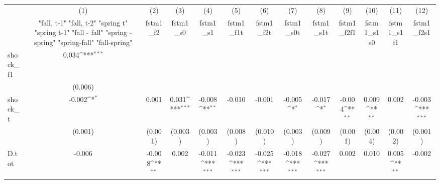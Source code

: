 {
\def\sym#1{\ifmmode^{#1}\else\(^{#1}\)\fi}
\begin{tabular}{l*{12}{c}}
\toprule
            &\multicolumn{1}{c}{(1)}&\multicolumn{1}{c}{(2)}&\multicolumn{1}{c}{(3)}&\multicolumn{1}{c}{(4)}&\multicolumn{1}{c}{(5)}&\multicolumn{1}{c}{(6)}&\multicolumn{1}{c}{(7)}&\multicolumn{1}{c}{(8)}&\multicolumn{1}{c}{(9)}&\multicolumn{1}{c}{(10)}&\multicolumn{1}{c}{(11)}&\multicolumn{1}{c}{(12)}\\
            &\multicolumn{1}{c}{  "fall, t-1" "fall, t-2" "spring t" "spring t-1"  "fall - fall" "spring - spring" "spring-fall" "fall-spring" }&\multicolumn{1}{c}{fstm1\_f2}&\multicolumn{1}{c}{fstm1\_s0}&\multicolumn{1}{c}{fstm1\_s1}&\multicolumn{1}{c}{fstm1\_f1t}&\multicolumn{1}{c}{fstm1\_f2t}&\multicolumn{1}{c}{fstm1\_s0t}&\multicolumn{1}{c}{fstm1\_s1t}&\multicolumn{1}{c}{fstm1\_f2f1}&\multicolumn{1}{c}{fstm1\_s1s0}&\multicolumn{1}{c}{fstm1\_s1f1}&\multicolumn{1}{c}{fstm1\_f2s1}\\
\midrule
shock\_f1    &       0.034\sym{***}&                     &                     &                     &                     &                     &                     &                     &                     &                     &                     &                     \\
            &     (0.006)         &                     &                     &                     &                     &                     &                     &                     &                     &                     &                     &                     \\
\addlinespace
shock\_t     &      -0.002\sym{*}  &       0.001         &       0.031\sym{***}&      -0.008\sym{**} &      -0.010         &      -0.001         &      -0.005\sym{*}  &      -0.017\sym{*}  &      -0.004\sym{**} &       0.009\sym{**} &       0.002         &      -0.003\sym{***}\\
            &     (0.001)         &     (0.001)         &     (0.003)         &     (0.003)         &     (0.008)         &     (0.010)         &     (0.003)         &     (0.009)         &     (0.001)         &     (0.004)         &     (0.002)         &     (0.001)         \\
\addlinespace
D.tot       &      -0.006         &      -0.008\sym{**} &       0.002         &      -0.011\sym{***}&      -0.023\sym{***}&      -0.025\sym{***}&      -0.018\sym{***}&      -0.027\sym{***}&       0.002         &       0.010         &       0.005\sym{**} &      -0.002         \\

\end{tabular}}
